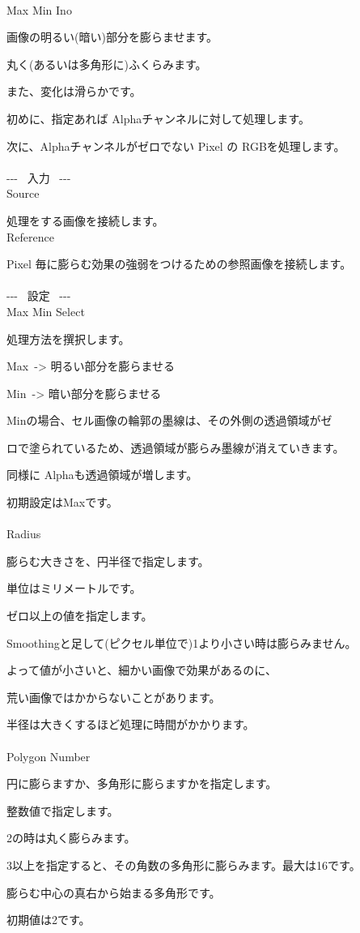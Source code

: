 \documentclass[a4paper,12pt]{article}
\begin{document}
\thispagestyle{empty}

\Large
\noindent \\
Max Min Ino\medskip
\par
\normalsize
画像の明るい(暗い)部分を膨らませます。\\
\par
丸く(あるいは多角形に)ふくらみます。\par
また、変化は滑らかです。\\
\par
初めに、指定あれば Alphaチャンネルに対して処理します。\par
次に、Alphaチャンネルがゼロでない Pixel の RGBを処理します。\\
\\
-{-}- \ 入力 \ -{-}-\\
Source\par
処理をする画像を接続します。\\
Reference\par
Pixel 毎に膨らむ効果の強弱をつけるための参照画像を接続します。\\
\\
-{-}- \ 設定 \ -{-}-\\
Max Min Select\par
処理方法を撰択します。\par
\textquotedbl Max\textquotedbl \ -> 明るい部分を膨らませる\par
\textquotedbl Min\textquotedbl \ -> 暗い部分を膨らませる\par
\textquotedbl Min\textquotedbl の場合、セル画像の輪郭の墨線は、その外側の透過領域がゼ\par
ロで塗られているため、透過領域が膨らみ墨線が消えていきます。\par
同様に Alphaも透過領域が増します。\par
初期設定は\textquotedbl Max\textquotedbl です。\\
\\
Radius\par
膨らむ大きさを、円半径で指定します。\par
単位はミリメートルです。\par
ゼロ以上の値を指定します。\par
Smoothingと足して(ピクセル単位で)1より小さい時は膨らみません。\par
よって値が小さいと、細かい画像で効果があるのに、\par
荒い画像ではかからないことがあります。\par
半径は大きくするほど処理に時間がかかります。\\
\\
Polygon Number\par
円に膨らますか、多角形に膨らますかを指定します。\par
整数値で指定します。\par
2の時は丸く膨らみます。\par
3以上を指定すると、その角数の多角形に膨らみます。最大は16です。\par
膨らむ中心の真右から始まる多角形です。\par
初期値は2です。
\end{document}
